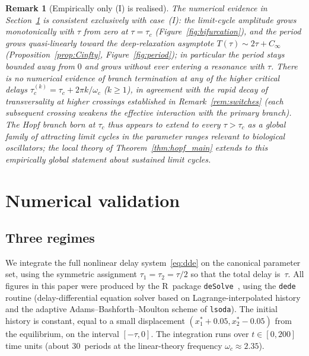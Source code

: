 \documentclass[sn-mathphys,Numbered]{sn-jnl}
\theoremstyle{thmstyleone}
\theoremstyle{thmstyletwo}
\theoremstyle{thmstylethree}
\newtheorem{remark}{Remark}
\begin{document}
\begin{remark}[Empirically only (I) is realised]
The numerical evidence in Section~\ref{sec:numerical} is consistent
exclusively with case~(I): the limit-cycle amplitude grows
monotonically with $\tau$ from zero at $\tau=\tau_c$
(Figure~\ref{fig:bifurcation}), and the period grows quasi-linearly
toward the deep-relaxation asymptote
$T(\tau)\sim 2\tau+C_\infty$
(Proposition~\ref{prop:Cinfty}, Figure~\ref{fig:period}); in particular
the period stays bounded away from $0$ and grows without ever entering
a resonance with $\tau$. There is no numerical evidence of
branch termination at any of the higher critical delays
$\tau_c^{(k)}\!=\!\tau_c\!+\!2\pi k/\omega_c$ ($k\geq 1$), in agreement
with the rapid decay of transversality at higher crossings established
in Remark~\ref{rem:switches} (each subsequent crossing weakens the
effective interaction with the primary branch). The Hopf branch born
at $\tau_c$ thus appears to extend to every $\tau>\tau_c$ as a global
family of attracting limit cycles in the parameter ranges relevant to
biological oscillators; the local theory of
Theorem~\ref{thm:hopf_main} extends to this empirically global
statement about sustained limit cycles.
\end{remark}

\section{Numerical validation}
\label{sec:numerical}

\subsection{Three regimes}

We integrate the full nonlinear delay system~\eqref{eq:dde} on the
canonical parameter set, using the symmetric assignment
$\tau_1=\tau_2=\tau/2$ so that the total delay is~$\tau$. All figures
in this paper were produced by the
R~package \texttt{deSolve}~\cite{soetaert2010solving}, using the
\texttt{dede} routine (delay-differential equation solver based on
Lagrange-interpolated history and the adaptive
Adams--Bashforth--Moulton scheme of \texttt{lsoda}). The initial history is constant,
equal to a small displacement $(x_1^*+0.05,x_2^*-0.05)$ from the
equilibrium, on the interval $[-\tau,0]$. The integration runs over
$t\in[0,200]$ time units (about $30$~periods at the linear-theory
frequency $\omega_c\approx 2.35$).
\end{document}
